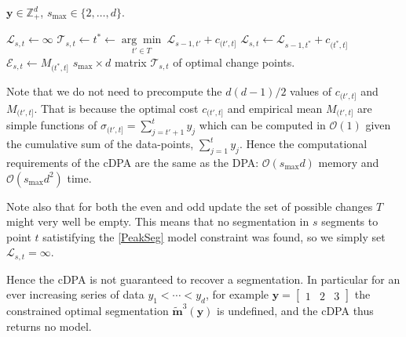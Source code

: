 \documentclass{article}
\newcommand{\ZZ}{\mathbb Z}
\begin{document}
\begin{algorithm}[H]
\begin{algorithmic}[1]
\REQUIRE $\mathbf y\in\ZZ_+^d$, $s_{\text{max}}\in\{2, \dots, d\}$.
\CASE{even}{$T \gets \{ t' < t \mid \mathcal{E}_{s-1,t'} < M_{(t', t]} \}$}
\ENDCASE
\CASE{ odd}{$T \gets \{ t' < t \mid \mathcal{E}_{s-1,t'} > M_{(t', t]} \}$}
\ENDCASE
\ENDSWITCH

  \STATE ${ \mathcal L}_{s,t} \gets \infty$
\ELSE
  \STATE $ \mathcal T_{s, t}\gets t^* \gets
  \underset{ t'\in T}{\arg \min}\  {\mathcal{L}}_{s-1,t'} + c_{(t',t]}$
  \STATE $ {\mathcal{L}}_{s,t} \gets 
  {\mathcal{L}}_{s-1,t^*} + c_{(t^*,t]} $
  \STATE $\mathcal{E}_{s,t} \gets M_{(t^*, t]}$
\ENDIF
\ENDFORFOR
\RETURN $s_{\text{max}}\times d$ matrix $\mathcal T_{s, t}$ of optimal change points.
\caption{Constrained dynamic programming (cDPA) 
}
\end{algorithmic}\label{algo:v2}
\end{algorithm}

Note that we do not need to precompute the $d(d-1)/2$ values of
$c_{(t',t]}$ and $M_{(t', t]}$. That is because the optimal cost
$c_{(t',t]}$ and empirical mean $M_{(t', t]}$ are simple functions of
$\sigma_{(t', t]} =\sum_{j=t'+1}^t y_j$ which can be computed in
$\mathcal{O}(1)$ given the cumulative sum of the data-points,
$\sum_{j=1}^t y_j$. Hence the computational requirements of the cDPA
are the same as the DPA: $\mathcal{O}(s_{\text{max}} d)$ memory and
$\mathcal O(s_{\text{max}} d^2)$ time.

Note also that for both the even and odd update the set of possible
changes $T$ might very well be empty. This means that no segmentation
in $s$ segments to point $t$ satistifying the \ref{PeakSeg} model
constraint was found, so we simply set ${\mathcal L}_{s, t} = \infty$.

Hence the cDPA is not guaranteed to recover a segmentation. In
particular for an ever increasing series of data $y_1 < \cdots < y_d$,
for example $\mathbf y = \left[ \begin{array}{ccc} 1 & 2 &
    3 \end{array}\right]$ the constrained optimal segmentation
$\mathbf{\tilde m}^3(\mathbf y)$ is undefined, and the cDPA thus
returns no model.
\end{document}
